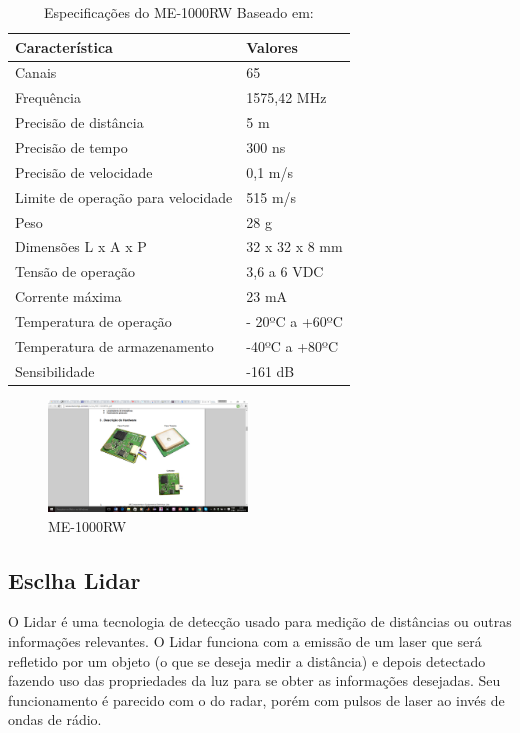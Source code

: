 \begin{table}[ht]
\caption{Especificações do ME-1000RW Baseado em: \cite{11gps}}
\centering
\begin{tabular}{| l |  p{5cm} |}
\hline
Característica & Valores \\
\hline
Canais & 65 \\
\hline
Frequência & 1575,42 MHz \\
\hline
Precisão de distância & 5 m \\
\hline
Precisão de tempo & 300 ns \\
\hline
Precisão de velocidade & 0,1 m/s \\
\hline
Limite de operação para velocidade & 515 m/s \\
\hline
Peso & 28 g \\
\hline
Dimensões L x A x P & 32 x 32 x 8 mm \\
\hline
Tensão de operação & 3,6 a 6 VDC \\
\hline
Corrente máxima & 23 mA \\
\hline
Temperatura de operação & - 20ºC a +60ºC \\
\hline
Temperatura de armazenamento & -40ºC a +80ºC \\
\hline
Sensibilidade & -161 dB \\
\hline
\end{tabular}
\label{table:especificacao_gps_me1000}
\end{table}


\begin{figure}[h]
  \centering
  \includegraphics[width=200px, scale=1]{figuras/gps_me1000}
  \caption{ME-1000RW \cite{11gps}}
\label{fig:gps_me1000}
\end{figure}



\subsection{Esclha Lidar}

O Lidar é uma tecnologia de detecção usado para medição de distâncias ou
outras informações relevantes. O Lidar funciona com a emissão de um laser
que será refletido por um objeto (o que se deseja medir a distância) e depois
detectado fazendo uso das propriedades da luz para se obter as informações
desejadas. Seu funcionamento é parecido com o do radar, porém com pulsos de
laser ao invés de ondas de rádio.


